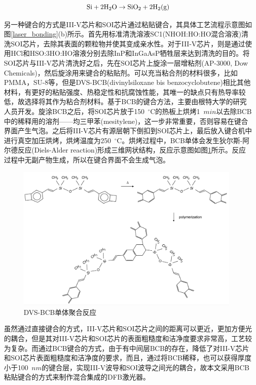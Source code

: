 \begin{equation}
\label{bonding_2}
\rm Si + 2H_{2}O \rightarrow SiO_2 +2H_2(g)
\end{equation}

另一种键合的方式是III-V芯片和SOI芯片通过粘贴键合，其具体工艺流程示意图如图\ref{laser_bonding}(b)所示。首先用标准清洗溶液SC1(NHOH:HO:HO混合溶液)清洗SOI芯片，去除其表面的颗粒物并使其变成亲水性。对于III-V芯片，则是通过使用HCl和HSO:3HO:HO溶液分别去除InP和InGaAsP牺牲层来达到清洗的目的。将SOI芯片与III-V芯片清洗好之后，先在SOI芯片上旋涂一层增粘剂(AP-3000, Dow Chemicals)，然后旋涂用来键合的粘贴剂。可以充当粘合剂的材料很多，比如PMMA，SU-8等，但是DVS-BCB(divinylsiloxane bis benzocyclobutene)相比其他材料，有更好的粘贴强度、热稳定性和抗腐蚀性能，其唯一的缺点只有热导率较低，故选择将其作为粘合剂材料。基于BCB的键合方法，主要由根特大学的研究人员开发\cite{roelkens2010iii}。旋涂BCB之后，将SOI芯片放于150~$^{\circ}$C的热板上烘烤1~$min$以去除BCB中的稀释用的溶剂——均三甲苯(mesitylene)，这一步非常重要，否则容易在键合界面产生气泡。之后将III-V芯片有源层朝下倒扣到SOI芯片上，最后放入键合机中进行真空加压烘烤，烘烤温度为250~$^{\circ}$C。烘烤过程中，BCB单体会发生狄尔斯-阿尔德反应(Diels-Alder reaction)形成三维网状结构，反应示意图如图\ref{laser_bcb}所示。反应过程中无副产物生成，所以在键合界面不会生成气泡。

\begin{figure}[htb]
	\centering
	\includegraphics[width=11cm]{./Pictures/laser_bcb.png}
	\captionsetup{justification=centering}
	\caption{DVS-BCB单体聚合反应}
	\label{laser_bcb}
\end{figure}

虽然通过直接键合的方式，III-V芯片和SOI芯片之间的距离可以更近，更加方便光的耦合，但是其对III-V芯片和SOI芯片的表面粗糙度和洁净度要求非常高，工艺较为复杂。而通过BCB键合的方式，由于有中间层BCB的存在，降低了对III-V芯片和SOI芯片表面粗糙度和洁净度的要求\cite{roelkens2007heterogeneous}，而且，通过将BCB稀释，也可以获得厚度小于100~$nm$的键合层，实现III-V波导和SOI波导之间光的耦合，故本文采用BCB粘贴键合的方式来制作混合集成的DFB激光器。

